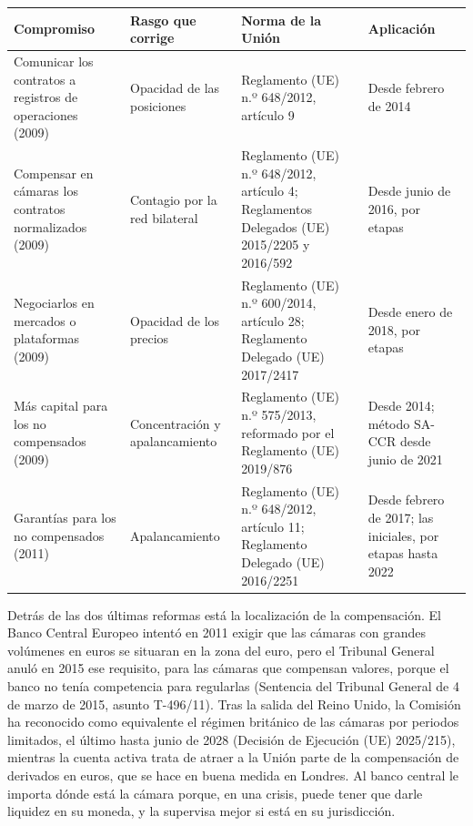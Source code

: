 \documentclass[10pt,a4paper]{article}
\begin{document}
\begin{center}
\small
\renewcommand{\arraystretch}{1.4}
\begin{tabular}{|p{3.4cm}|p{2.8cm}|p{4.6cm}|p{2.9cm}|}
    \hline
    \centering\textbf{Compromiso} & \centering\textbf{Rasgo que corrige} & \centering\textbf{Norma de la Unión} & \centering\textbf{Aplicación}\tabularnewline
    \hline
    \raggedright Comunicar los contratos a registros de operaciones (2009) & \raggedright Opacidad de las posiciones & \raggedright Reglamento (UE) n.º 648/2012, artículo 9 & \raggedright Desde febrero de 2014\tabularnewline
    \hline
    \raggedright Compensar en cámaras los contratos normalizados (2009) & \raggedright Contagio por la red bilateral & \raggedright Reglamento (UE) n.º 648/2012, artículo 4; Reglamentos Delegados (UE) 2015/2205 y 2016/592 & \raggedright Desde junio de 2016, por etapas\tabularnewline
    \hline
    \raggedright Negociarlos en mercados o plataformas (2009) & \raggedright Opacidad de los precios & \raggedright Reglamento (UE) n.º 600/2014, artículo 28; Reglamento Delegado (UE) 2017/2417 & \raggedright Desde enero de 2018, por etapas\tabularnewline
    \hline
    \raggedright Más capital para los no compensados (2009) & \raggedright Concentración y apalancamiento & \raggedright Reglamento (UE) n.º 575/2013, reformado por el Reglamento (UE) 2019/876 & \raggedright Desde 2014; método SA-CCR desde junio de 2021\tabularnewline
    \hline
    \raggedright Garantías para los no compensados (2011) & \raggedright Apalancamiento & \raggedright Reglamento (UE) n.º 648/2012, artículo 11; Reglamento Delegado (UE) 2016/2251 & \raggedright Desde febrero de 2017; las iniciales, por etapas hasta 2022\tabularnewline
    \hline
\end{tabular}
\end{center}

Detrás de las dos últimas reformas está la localización de la compensación. El Banco Central Europeo intentó en 2011 exigir que las cámaras con grandes volúmenes en euros se situaran en la zona del euro, pero el Tribunal General anuló en 2015 ese requisito, para las cámaras que compensan valores, porque el banco no tenía competencia para regularlas (Sentencia del Tribunal General de 4 de marzo de 2015, asunto T-496/11). Tras la salida del Reino Unido, la Comisión ha reconocido como equivalente el régimen británico de las cámaras por periodos limitados, el último hasta junio de 2028 (Decisión de Ejecución (UE) 2025/215), mientras la cuenta activa trata de atraer a la Unión parte de la compensación de derivados en euros, que se hace en buena medida en Londres. Al banco central le importa dónde está la cámara porque, en una crisis, puede tener que darle liquidez en su moneda, y la supervisa mejor si está en su jurisdicción.
\end{document}

